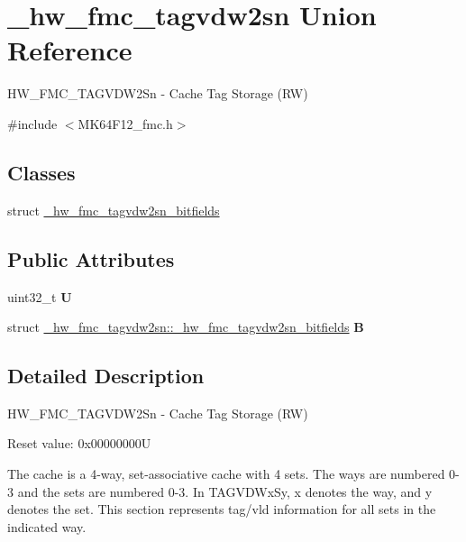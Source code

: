 \hypertarget{union__hw__fmc__tagvdw2sn}{}\section{\+\_\+hw\+\_\+fmc\+\_\+tagvdw2sn Union Reference}
\label{union__hw__fmc__tagvdw2sn}


H\+W\+\_\+\+F\+M\+C\+\_\+\+T\+A\+G\+V\+D\+W2\+Sn -\/ Cache Tag Storage (RW)  




{\ttfamily \#include $<$M\+K64\+F12\+\_\+fmc.\+h$>$}

\subsection*{Classes}
\begin{DoxyCompactItemize}
\item 
struct \hyperlink{struct__hw__fmc__tagvdw2sn_1_1__hw__fmc__tagvdw2sn__bitfields}{\+\_\+hw\+\_\+fmc\+\_\+tagvdw2sn\+\_\+bitfields}
\end{DoxyCompactItemize}
\subsection*{Public Attributes}
\begin{DoxyCompactItemize}
\item 
uint32\+\_\+t {\bfseries U}\hypertarget{union__hw__fmc__tagvdw2sn_a341800c62b45dee3396bb18d7046a382}{}\label{union__hw__fmc__tagvdw2sn_a341800c62b45dee3396bb18d7046a382}

\item 
struct \hyperlink{struct__hw__fmc__tagvdw2sn_1_1__hw__fmc__tagvdw2sn__bitfields}{\+\_\+hw\+\_\+fmc\+\_\+tagvdw2sn\+::\+\_\+hw\+\_\+fmc\+\_\+tagvdw2sn\+\_\+bitfields} {\bfseries B}\hypertarget{union__hw__fmc__tagvdw2sn_a870d5e3a61eb79727020b77bfb4f3532}{}\label{union__hw__fmc__tagvdw2sn_a870d5e3a61eb79727020b77bfb4f3532}

\end{DoxyCompactItemize}


\subsection{Detailed Description}
H\+W\+\_\+\+F\+M\+C\+\_\+\+T\+A\+G\+V\+D\+W2\+Sn -\/ Cache Tag Storage (RW) 

Reset value\+: 0x00000000U

The cache is a 4-\/way, set-\/associative cache with 4 sets. The ways are numbered 0-\/3 and the sets are numbered 0-\/3. In T\+A\+G\+V\+D\+Wx\+Sy, x denotes the way, and y denotes the set. This section represents tag/vld information for all sets in the indicated way. 


